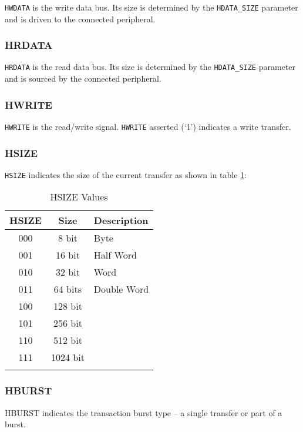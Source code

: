 \texttt{HWDATA} is the write data bus. Its size is determined by the
\texttt{HDATA\_SIZE} parameter and is driven to the connected
peripheral.

\subsubsection{HRDATA}

\texttt{HRDATA} is the read data bus. Its size is determined by the
\texttt{HDATA\_SIZE} parameter and is sourced by the connected
peripheral.

\subsubsection{HWRITE}

\texttt{HWRITE} is the read/write signal. \texttt{HWRITE} asserted (`1')
indicates a write transfer.

\subsubsection{HSIZE}

\texttt{HSIZE} indicates the size of the current transfer as shown in table \ref{tab:HSIZE}:

\begin{longtable}[c]{@{\extracolsep{\fill}}ccl}	
		\toprule 
		\textbf{HSIZE} & \textbf{Size} & \textbf{Description}\\
		\midrule
		\endhead 
		000 & 8 bit & Byte\\
		001 & 16 bit & Half Word\\
		010 & 32 bit & Word\\
		011 & 64 bits & Double Word\\
		100 & 128 bit &\\
		101 & 256 bit &\\
		110 & 512 bit &\\
		111 & 1024 bit &\\
		\bottomrule 	
	\caption{HSIZE Values}
	\label{tab:HSIZE}
\end{longtable}

\subsubsection{HBURST}

HBURST indicates the transaction burst type -- a single transfer or part
of a burst.

